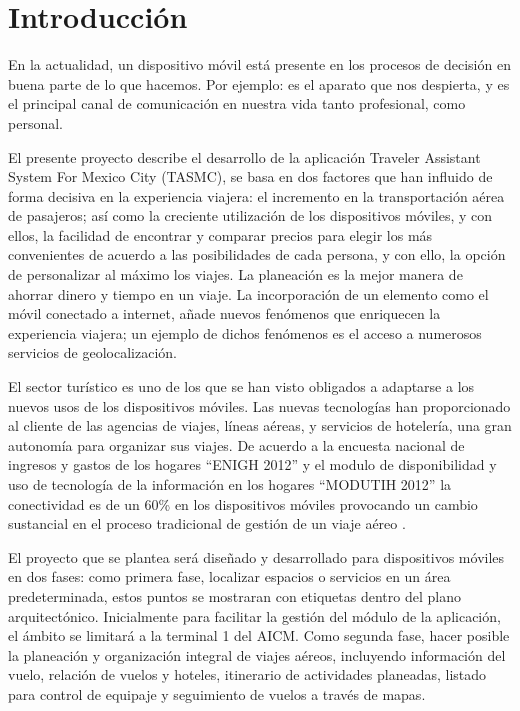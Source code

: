 
\chapter{Introducción} %

\label{Introduccion} %



En la actualidad, un dispositivo móvil está presente en los procesos de decisión en buena parte de lo que hacemos. Por ejemplo: es el aparato que nos despierta, y es el principal canal de comunicación en nuestra vida tanto profesional, como personal.

El presente proyecto describe el desarrollo de la aplicación Traveler Assistant System For Mexico City (TASMC), se basa en dos factores que han influido de forma decisiva en la experiencia viajera: el incremento en la transportación aérea de pasajeros; así como la creciente utilización de los dispositivos móviles, y con ellos, la facilidad de encontrar y comparar precios para elegir los más convenientes de acuerdo a las posibilidades de cada persona, y con ello, la opción de personalizar al máximo los viajes. La planeación es la mejor manera de ahorrar dinero y tiempo en un viaje. La incorporación de un elemento como el móvil conectado a internet, añade  nuevos fenómenos que enriquecen la experiencia viajera; un ejemplo de dichos fenómenos es el acceso a numerosos servicios de geolocalización.

El sector turístico es uno de los que se han visto obligados a adaptarse a los nuevos usos de los dispositivos móviles. Las nuevas tecnologías han proporcionado al cliente de las agencias de viajes, líneas aéreas, y servicios de hotelería, una gran autonomía \cite{appsVIajar} para organizar sus viajes. De acuerdo a la encuesta nacional de ingresos y gastos de los hogares “ENIGH 2012” y el modulo de disponibilidad y uso de tecnología de la información en los hogares “MODUTIH 2012” la conectividad es de un 60\% en los dispositivos móviles provocando un cambio sustancial en el proceso tradicional de gestión de un viaje aéreo \cite{endutih}.

El proyecto que se plantea será diseñado y desarrollado para dispositivos móviles en dos fases: como primera fase, localizar espacios o servicios en un área predeterminada, estos puntos se mostraran con etiquetas dentro del plano arquitectónico. Inicialmente para facilitar la gestión del módulo de la aplicación, el ámbito se limitará a la terminal 1 del AICM. Como segunda fase, hacer posible la planeación y organización integral de viajes aéreos, incluyendo información del vuelo, relación de vuelos y hoteles, itinerario de actividades planeadas, listado para control de equipaje y seguimiento de vuelos a través de mapas.


